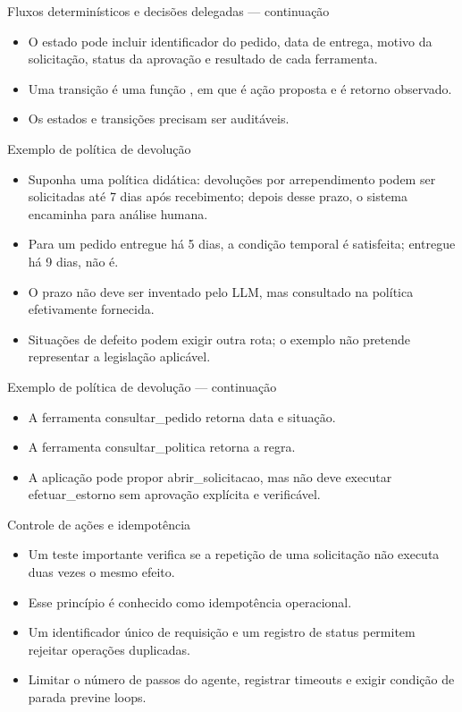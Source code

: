 \documentclass[10pt,aspectratio=169]{beamer}
\begin{document}
\begin{frame}[t]{Fluxos determinísticos e decisões delegadas — continuação}
\small
\begin{itemize}
\item O estado pode incluir identificador do pedido, data de entrega, motivo da solicitação, status da aprovação e resultado de cada ferramenta.
\item Uma transição é uma função , em que é ação proposta e é retorno observado.
\item Os estados e transições precisam ser auditáveis.
\end{itemize}
\end{frame}

\begin{frame}[t]{Exemplo de política de devolução}
\small
\begin{itemize}
\item Suponha uma política didática: devoluções por arrependimento podem ser solicitadas até 7 dias após recebimento; depois desse prazo, o sistema encaminha para análise humana.
\item Para um pedido entregue há 5 dias, a condição temporal é satisfeita; entregue há 9 dias, não é.
\item O prazo não deve ser inventado pelo LLM, mas consultado na política efetivamente fornecida.
\item Situações de defeito podem exigir outra rota; o exemplo não pretende representar a legislação aplicável.
\end{itemize}
\end{frame}

\begin{frame}[t]{Exemplo de política de devolução — continuação}
\small
\begin{itemize}
\item A ferramenta consultar\_pedido retorna data e situação.
\item A ferramenta consultar\_politica retorna a regra.
\item A aplicação pode propor abrir\_solicitacao, mas não deve executar efetuar\_estorno sem aprovação explícita e verificável.
\end{itemize}
\end{frame}

\begin{frame}[t]{Controle de ações e idempotência}
\small
\begin{itemize}
\item Um teste importante verifica se a repetição de uma solicitação não executa duas vezes o mesmo efeito.
\item Esse princípio é conhecido como idempotência operacional.
\item Um identificador único de requisição e um registro de status permitem rejeitar operações duplicadas.
\item Limitar o número de passos do agente, registrar timeouts e exigir condição de parada previne loops.
\end{itemize}
\end{frame}
\end{document}
